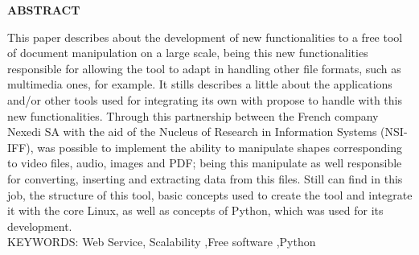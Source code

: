 \begin{center}
\textbf{ABSTRACT}
\end{center}

\singlespacing

\noindent This paper describes about the development of new functionalities to a free tool of document manipulation on a large scale, being this new functionalities responsible for allowing the tool to adapt in handling other file formats, such as multimedia ones, for example. It stills describes a little about the applications and/or other tools used for integrating its own with propose to handle with this new functionalities. Through this partnership between the French company Nexedi SA with the aid of the Nucleus of Research in Information Systems (NSI-IFF), was possible to implement the ability to manipulate shapes corresponding to video files, audio, images and PDF; being this manipulate as well responsible for converting, inserting and extracting data from this files. Still can find in this job, the structure of this tool, basic concepts used to create the tool and integrate it with the core Linux, as well as concepts of Python, which was used for its development. \\

\noindent KEYWORDS: Web Service, Scalability ,Free software ,Python

